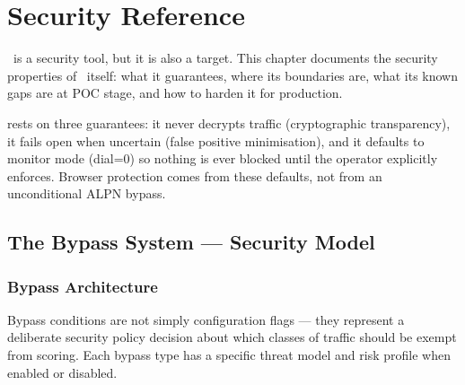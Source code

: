 
\chapter{Security Reference}
\label{ch:security}

\begin{chapterquote}
\ja\ is a security tool, but it is also a target. This chapter documents the security
properties of \ja\ itself: what it guarantees, where its boundaries are, what its
known gaps are at POC stage, and how to harden it for production.
\end{chapterquote}

 rests on three guarantees: it never decrypts
traffic (cryptographic transparency), it fails open when uncertain (false positive
minimisation), and it defaults to monitor mode (dial=0) so nothing is ever blocked
until the operator explicitly enforces. Browser protection comes from these defaults,
not from an unconditional ALPN bypass.

\section{The Bypass System — Security Model}

\subsection{Bypass Architecture}

Bypass conditions are not simply configuration flags — they represent a deliberate
security policy decision about which classes of traffic should be exempt from scoring.
Each bypass type has a specific threat model and risk profile when enabled or disabled.

